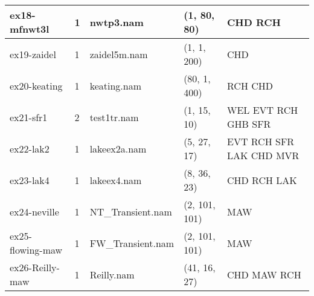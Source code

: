 \begin{longtable}{p{3cm} p{1cm} p{3cm} p{2.5cm}p{4cm}}
\hline
ex18-mfnwt3l & 1 & \parbox[t]{3cm}{ nwtp3.nam \\}& \parbox[t]{3cm}{ (1, 80, 80) \\}& \parbox[t]{4cm}{ CHD RCH  \\}\\
\hline
ex19-zaidel & 1 & \parbox[t]{3cm}{ zaidel5m.nam \\}& \parbox[t]{3cm}{ (1, 1, 200) \\}& \parbox[t]{4cm}{ CHD  \\}\\
\hline
ex20-keating & 1 & \parbox[t]{3cm}{ keating.nam \\}& \parbox[t]{3cm}{ (80, 1, 400) \\}& \parbox[t]{4cm}{ RCH CHD  \\}\\
\hline
ex21-sfr1 & 2 & \parbox[t]{3cm}{ test1tr.nam \\}& \parbox[t]{3cm}{ (1, 15, 10) \\}& \parbox[t]{4cm}{ WEL EVT RCH GHB SFR  \\}\\
\hline
ex22-lak2 & 1 & \parbox[t]{3cm}{ lakeex2a.nam \\}& \parbox[t]{3cm}{ (5, 27, 17) \\}& \parbox[t]{4cm}{ EVT RCH SFR LAK CHD MVR  \\}\\
\hline
ex23-lak4 & 1 & \parbox[t]{3cm}{ lakeex4.nam \\}& \parbox[t]{3cm}{ (8, 36, 23) \\}& \parbox[t]{4cm}{ CHD RCH LAK  \\}\\
\hline
ex24-neville & 1 & \parbox[t]{3cm}{ NT\_Transient.nam \\}& \parbox[t]{3cm}{ (2, 101, 101) \\}& \parbox[t]{4cm}{ MAW  \\}\\
\hline
ex25-flowing-maw & 1 & \parbox[t]{3cm}{ FW\_Transient.nam \\}& \parbox[t]{3cm}{ (2, 101, 101) \\}& \parbox[t]{4cm}{ MAW  \\}\\
\hline
ex26-Reilly-maw & 1 & \parbox[t]{3cm}{ Reilly.nam \\}& \parbox[t]{3cm}{ (41, 16, 27) \\}& \parbox[t]{4cm}{ CHD MAW RCH  \\}\\

\end{longtable}
